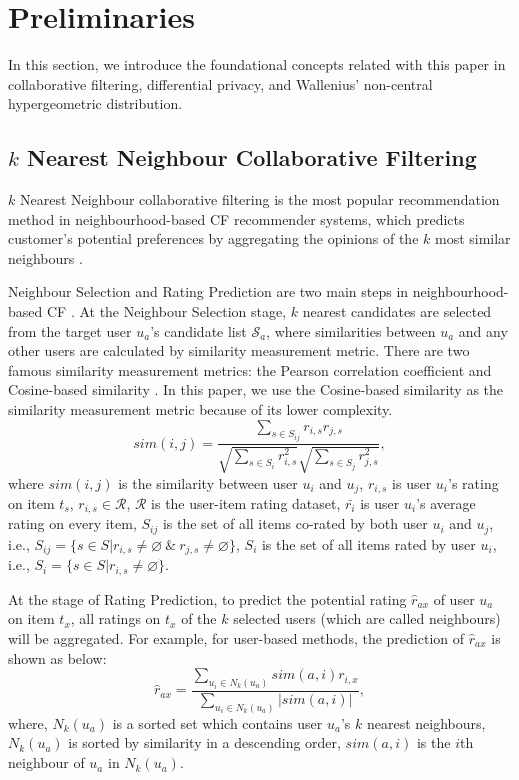 \documentclass[11pt]{article}
\begin{document}
\section{Preliminaries}
\label{PRE}
In this section, we introduce the foundational concepts related with this paper in collaborative filtering, differential privacy, and Wallenius' non-central hypergeometric distribution.

\subsection{$k$ Nearest Neighbour Collaborative Filtering}
$k$ Nearest Neighbour collaborative filtering is the most popular recommendation method in neighbourhood-based CF recommender systems, which predicts customer's potential preferences by aggregating the opinions of the $k$ most similar neighbours \cite{ADOMAVICIUS2005}.

Neighbour Selection and Rating Prediction are two main steps in neighbourhood-based CF \cite{ZHU2014}. At the Neighbour Selection stage, $k$ nearest candidates are selected from the target user $u_a$'s candidate list $\mathcal{S}_a$, where similarities between $u_a$ and any other users are calculated by similarity measurement metric. There are two famous similarity measurement metrics: the Pearson correlation coefficient and Cosine-based similarity \cite{ADOMAVICIUS2005}. In this paper, we use the Cosine-based similarity \cite{RAJARAMAN2011} as the similarity measurement metric because of its lower complexity.
\begin{equation}
\label{COS}
sim(i,j)=\frac{\sum_{s\in S_{ij}}r_{i,s}r_{j,s}}{\sqrt{\sum_{s\in S_{i}}r_{i,s}^2}\sqrt{\sum_{s\in S_{j}}r_{j,s}^2}},
\end{equation}
where $sim(i,j)$ is the similarity between user $u_i$ and $u_j$, $r_{i,s}$ is user $u_i$'s rating on item $t_s$, $r_{i,s}\in\mathcal{R}$, $\mathcal{R}$ is the user-item rating dataset, $\bar{r_i}$ is user $u_i$'s average rating on every item, $S_{ij}$ is the set of all items co-rated by both user $u_i$ and $u_j$, i.e., $S_{ij}=\{s\in S|r_{i,s}\neq \varnothing \ \&\ r_{j,s}\neq \varnothing \}$, $S_{i}$ is the set of all items rated by user $u_{i}$, i.e., $S_{i}=\{s\in S|r_{i,s}\neq \varnothing \}$.

At the stage of Rating Prediction, to predict the potential rating $\hat{r}_{ax}$ of user $u_a$ on item $t_x$, all ratings on $t_x$ of the $k$ selected users (which are called neighbours) will be aggregated. For example, for user-based methods, the prediction of $\hat r_{ax}$ is shown as below:
\begin{equation}
\label{PRED}
\hat{r}_{ax}=\frac{\sum_{u_i\in
N_k(u_a)}sim(a,i)r_{i,x}}{\sum_{u_i\in N_k(u_a)}|sim(a,i)|},
\end{equation}
where, $N_k(u_a)$ is a sorted set which contains user $u_a$'s $k$ nearest neighbours, $N_k(u_a)$ is sorted by similarity in a descending order, $sim(a,i)$ is the $i$th neighbour of $u_a$ in $N_k(u_a)$.
\end{document}
